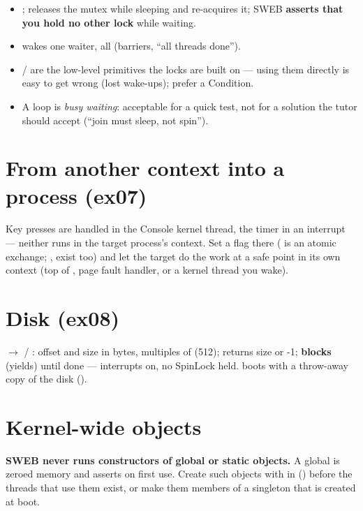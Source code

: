 \begin{itemize}
\item {};  releases the mutex while sleeping and
  re-acquires it; SWEB \textbf{asserts that you hold no other lock} while waiting.
\item {} wakes one waiter,  all (barriers, ``all threads done'').
\item {} /  are the low-level primitives the locks are
  built on --- using them directly is easy to get wrong (lost wake-ups); prefer a Condition.
\item A  loop is \emph{busy waiting}: acceptable for a quick test,
  not for a solution the tutor should accept (``join must sleep, not spin'').
\end{itemize}

\section{From another context into a process (ex07)}

Key presses are handled in the Console kernel thread, the timer in an interrupt --- neither
runs in the target process's context. Set a flag there (
is an atomic exchange; ,  exist too) and let the target
do the work at a safe point in its own context (top of , page fault
handler, or a kernel thread you wake).

\section{Disk (ex08)}

 $\to$
 / : offset and size in
bytes, multiples of  (512); returns size or -1; \textbf{blocks} (yields)
until done --- interrupts on, no SpinLock held.  boots with a throw-away
copy of the disk ().

\section{Kernel-wide objects}

\textbf{SWEB never runs constructors of global or static objects.} A global
 is zeroed memory and asserts on first use. Create such objects with
 in  () before the threads that use them exist, or
make them members of a singleton that is created at boot.

